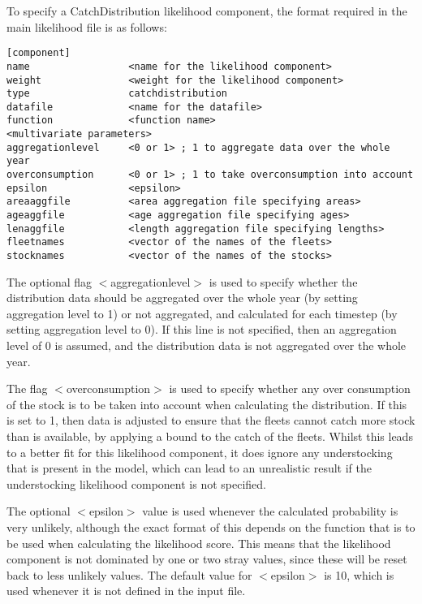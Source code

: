 \documentclass [a4paper, 10pt]{book}
\begin{document}
\bigskip
To specify a CatchDistribution likelihood component, the format required in the main likelihood file is as follows:

{\small\begin{verbatim}
[component]
name                 <name for the likelihood component>
weight               <weight for the likelihood component>
type                 catchdistribution
datafile             <name for the datafile>
function             <function name>
<multivariate parameters>
aggregationlevel     <0 or 1> ; 1 to aggregate data over the whole year
overconsumption      <0 or 1> ; 1 to take overconsumption into account
epsilon              <epsilon>
areaaggfile          <area aggregation file specifying areas>
ageaggfile           <age aggregation file specifying ages>
lenaggfile           <length aggregation file specifying lengths>
fleetnames           <vector of the names of the fleets>
stocknames           <vector of the names of the stocks>
\end{verbatim}}

The optional flag $<$aggregationlevel$>$ is used to specify whether the distribution data should be aggregated over the whole year (by setting aggregation level to 1) or not aggregated, and calculated for each timestep (by setting aggregation level to 0).  If this line is not specified, then an aggregation level of 0 is assumed, and the distribution data is not aggregated over the whole year.

\bigskip
The flag $<$overconsumption$>$ is used to specify whether any over consumption of the stock is to be taken into account when calculating the distribution.  If this is set to 1, then data is adjusted to ensure that the fleets cannot catch more stock than is available, by applying a bound to the catch of the fleets.  Whilst this leads to a better fit for this likelihood component, it does ignore any understocking that is present in the model, which can lead to an unrealistic result if the understocking likelihood component is not specified.

\bigskip
The optional $<$epsilon$>$ value is used whenever the calculated probability is very unlikely, although the exact format of this depends on the function that is to be used when calculating the likelihood score.  This means that the likelihood component is not dominated by one or two stray values, since these will be reset back to less unlikely values.  The default value for $<$epsilon$>$ is 10, which is used whenever it is not defined in the input file.
\end{document}
